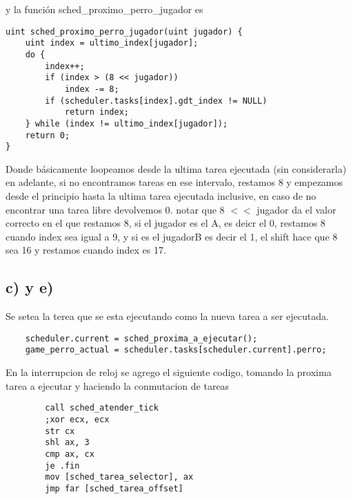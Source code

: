 y la función sched\_proximo\_perro\_jugador es 

\begin{codesnippet}
\begin{verbatim}
uint sched_proximo_perro_jugador(uint jugador) {
    uint index = ultimo_index[jugador];
    do {
        index++;
        if (index > (8 << jugador))
            index -= 8;
        if (scheduler.tasks[index].gdt_index != NULL)
            return index;
    } while (index != ultimo_index[jugador]);
    return 0;
}
\end{verbatim}
\end{codesnippet}

Donde básicamente loopeamos desde la ultima tarea ejecutada (sin considerarla) en adelante, si no encontramos tareas en ese intervalo, restamos 8 y empezamos desde el principio hasta la ultima tarea ejecutada inclusive, en caso de no encontrar una tarea 
libre devolvemos 0. notar que 8 $<<$ jugador da el valor correcto en el que restamos 8, si el jugador es el A, es deicr el 0, restamos 8 cuando index sea igual a 9, y si es el jugadorB es decir el 1, el shift hace que 8 sea 16 y restamos cuando index es 17. 



\subsection{c) y e)}
 Se setea la terea que se esta ejecutando como la nueva tarea a ser ejecutada. 
\begin{codesnippet}
\begin{verbatim}
	scheduler.current = sched_proxima_a_ejecutar();
    game_perro_actual = scheduler.tasks[scheduler.current].perro;
    \end{verbatim}
\end{codesnippet}

En la interrupcion de reloj se agrego el siguiente codigo, tomando la proxima tarea a ejecutar y haciendo la conmutacion de tareas
  \begin{codesnippet}
\begin{verbatim}
        call sched_atender_tick
        ;xor ecx, ecx
        str cx
        shl ax, 3
        cmp ax, cx
        je .fin
        mov [sched_tarea_selector], ax
        jmp far [sched_tarea_offset]
            \end{verbatim}
\end{codesnippet}

